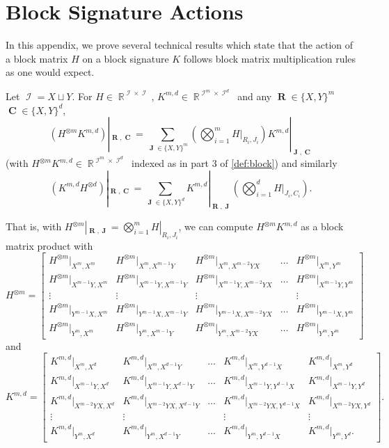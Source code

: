 \documentclass{article}
\DeclareMathOperator{\rr}{\mathbb{R}}
\DeclareMathOperator{\vr}{\mathbf{R}}
\DeclareMathOperator{\vc}{\mathbf{C}}
\DeclareMathOperator{\vj}{\mathbf{J}}
\DeclareMathOperator{\ic}{\mathcal{I}}
\begin{document}
\section{Block Signature Actions}
\label{sec:appendix_block}
In this appendix, we prove several technical results which state that the action of a 
block matrix $H$ on a block signature $K$ follows block matrix multiplication rules as one would expect.
\begin{proposition}
    \label{prop:block}
    Let $\ic = X \sqcup Y$.
    For $H \in \rr^{\ic\times\ic}$, $K^{m,d} \in \rr^{\ic^m \times \ic^d}$ and any $\vr\in\{X,Y\}^m$
    $\vc\in\{X,Y\}^d$,
    \[
        (H^{\otimes m} K^{m,d})|_{\vr,\vc} = 
        \sum_{\vj \in \{X,Y\}^m} \left(\bigotimes_{i=1}^m H|_{R_i,J_i}\right) K^{m,d}|_{\vj,\vc}
    \]
    (with $H^{\otimes m} K^{m,d} \in \rr^{\ic^m \times \ic^d}$ 
    indexed as in part 3 of \autoref{def:block}) and similarly
    \[
        (K^{m,d}H^{\otimes d})|_{\vr,\vc} = 
        \sum_{\vj \in \{X,Y\}^d}  K^{m,d}|_{\vr,\vj}\left(\bigotimes_{i=1}^d H|_{J_i,C_i}\right).
    \]
\end{proposition}
That is, with $H^{\otimes m}|_{\vr,\vj} = \bigotimes_{i=1}^m H|_{R_i,J_i}$,
we can compute $H^{\otimes m}K^{m,d}$ as a block matrix product with
\[
    H^{\otimes m} = 
    \begin{bmatrix} 
        H^{\otimes m}|_{X^{m},X^{m}} &
        H^{\otimes m}|_{X^{m},X^{m-1}Y} & 
        H^{\otimes m}|_{X^{m},X^{m-2}YX} & \ldots & 
        H^{\otimes m}|_{X^{m},Y^{m}}\\
        H^{\otimes m}|_{X^{m-1}Y,X^{m}} &
        H^{\otimes m}|_{X^{m-1}Y,X^{m-1}Y} & 
        H^{\otimes m}|_{X^{m-1}Y,X^{m-2}YX} & \ldots & 
        H^{\otimes m}|_{X^{m-1}Y,Y^{m}}\\
        \vdots & \vdots & \vdots && \vdots \\
        H^{\otimes m}|_{Y^{m-1}X,X^{m}} & 
        H^{\otimes m}|_{Y^{m-1}X,X^{m-1}Y} &
        H^{\otimes m}|_{Y^{m-1}X,X^{m-2}YX} & \ldots & 
        H^{\otimes m}|_{Y^{m-1}X,Y^{m}}
        \\
        H^{\otimes m}|_{Y^{m},X^{m}} 
        & H^{\otimes m}|_{Y^{m},X^{m-1}Y} 
        & H^{\otimes m}|_{Y^{m},X^{m-2}YX} 
        & \ldots & H^{\otimes m}|_{Y^{m},Y^{m}} 
    \end{bmatrix}
\]
and
\[
    K^{m,d} =
    \begin{bmatrix} 
        K^{m,d}|_{X^{m},X^{d}} &
        K^{m,d}|_{X^{m},X^{d-1}Y} & \ldots &
        K^{m,d}|_{X^{m},Y^{d-1}X} & 
        K^{m,d}|_{X^{m},Y^{d}}\\
        K^{m,d}|_{X^{m-1}Y,X^{d}} &
        K^{m,d}|_{X^{m-1}Y,X^{d-1}Y} & \ldots & 
        K^{m,d}|_{X^{m-1}Y,Y^{d-1}X} & 
        K^{m,d}|_{X^{m-1}Y,Y^{d}}\\
        K^{m,d}|_{X^{m-2}YX,X^{d}} & 
        K^{m,d}|_{X^{m-2}YX,X^{d-1}Y} &\ldots & 
        K^{m,d}|_{X^{m-2}YX,Y^{d-1}X} & 
        K^{m,d}|_{X^{m-2}YX,Y^{d}} \\
        \vdots & \vdots && \vdots & \vdots \\
        K^{m,d}|_{Y^{m},X^{d}} &
        K^{m,d}|_{Y^{m},X^{d-1}Y} & \ldots & 
        K^{m,d}|_{Y^{m},Y^{d-1}X} &
        K^{m,d}|_{Y^{m},Y^{d}}.
    \end{bmatrix}.
\]
\end{document}
